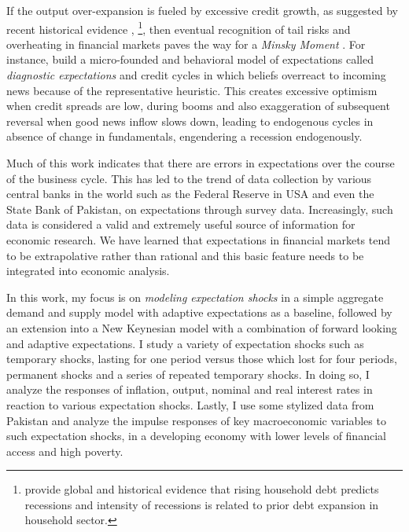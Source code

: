 \documentclass[12pt]{article}
\newcommand{\1}{\mathbbm 1}
\begin{document}
		 
		 If the output over-expansion is fueled by excessive credit growth, as suggested by recent historical evidence \cite{schularick2012credit}, \cite{mian2017household}\footnote{\cite{mian2017household} provide global and historical evidence that rising household debt predicts recessions and intensity of recessions is related to prior debt expansion in household sector.}, then eventual recognition of tail risks and overheating in financial markets paves the way for a \textit{Minsky Moment} \cite{minsky1977financial}. For instance, \cite{bordalo2018diagnostic} build a micro-founded and behavioral model of expectations called \textit{diagnostic expectations} and credit cycles in which beliefs overreact to incoming news because of the representative heuristic. This creates excessive optimism when credit spreads are low, during booms and also exaggeration of subsequent reversal when good news inflow slows down, leading to endogenous cycles in absence of change in fundamentals, engendering a recession endogenously.
		 
		 
		 Much of this work indicates that there are errors in expectations over the course of the business cycle. This has led to the trend of data collection by various central banks in the world such as the Federal Reserve in USA and even the State Bank of Pakistan, on expectations through survey data. Increasingly, such data is considered a valid and extremely useful source of information for economic research. We have learned that expectations in financial markets tend to be extrapolative rather than rational and this basic feature needs to be integrated into economic analysis.
		 
		 
		 
		
		
		
		
		In this work, my focus is on \textit{modeling expectation shocks} in a simple aggregate demand and supply model with adaptive expectations as a baseline, followed by an extension into a New Keynesian model with a combination of forward looking and adaptive expectations. I study a variety of expectation shocks such as temporary shocks, lasting for one period versus those which lost for four periods, permanent shocks and a series of repeated temporary shocks. In doing so, I analyze the responses of inflation, output, nominal and real interest rates in reaction to various expectation shocks. Lastly, I use some stylized data from Pakistan and analyze the impulse responses of key macroeconomic variables to such expectation shocks, in a developing economy with lower levels of financial access and high poverty.
		
\end{document}
